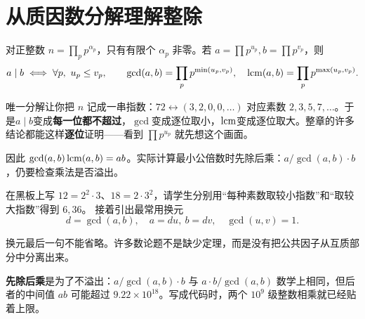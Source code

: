 \section{从质因数分解理解整除}
对正整数 $n=\prod_p p^{\alpha_p}$，只有有限个 $\alpha_p$ 非零。若 $a=\prod p^{u_p},b=\prod p^{v_p}$，则
\[
 a\mid b\iff\forall p,\ u_p\le v_p,\qquad
 \gcd(a,b)=\prod_p p^{\min(u_p,v_p)},\quad
 \operatorname{lcm}(a,b)=\prod_p p^{\max(u_p,v_p)}.
\]

\begin{tip}
唯一分解让你把 $n$ 记成一串指数：$72\leftrightarrow(3,2,0,0,\ldots)$ 对应素数 $2,3,5,7,\ldots$。于是\textbf{$a\mid b$}变成\textbf{每一位都不超过}，\textbf{$\gcd$}变成逐位取小，\textbf{$\operatorname{lcm}$}变成逐位取大。整章的许多结论都能这样\textbf{逐位}证明——看到 $\prod p^{u_p}$ 就先想这个画面。
\end{tip}

因此 $\gcd(a,b)\operatorname{lcm}(a,b)=ab$。实际计算最小公倍数时先除后乘：$a/\gcd(a,b)\cdot b$，仍要检查乘法是否溢出。


\begin{teach}
在黑板上写 $12=2^2\cdot3$、$18=2\cdot3^2$，请学生分别用“每种素数取较小指数”和“取较大指数”得到 $6,36$。
接着引出最常用换元
\[
 d=\gcd(a,b),\quad a=du,\ b=dv,\quad\gcd(u,v)=1.
\]


换元最后一句不能省略。许多数论题不是缺少定理，而是没有把公共因子从互质部分中分离出来。
\end{teach}

\begin{tip}
\textbf{先除后乘}是为了不溢出：$a/\gcd(a,b)\cdot b$ 与 $a\cdot b/\gcd(a,b)$ 数学上相同，但后者的中间值 $ab$ 可能超过 $9.22\times10^{18}$。写成代码时，两个 $10^9$ 级整数相乘就已经贴着上限。
\end{tip}



